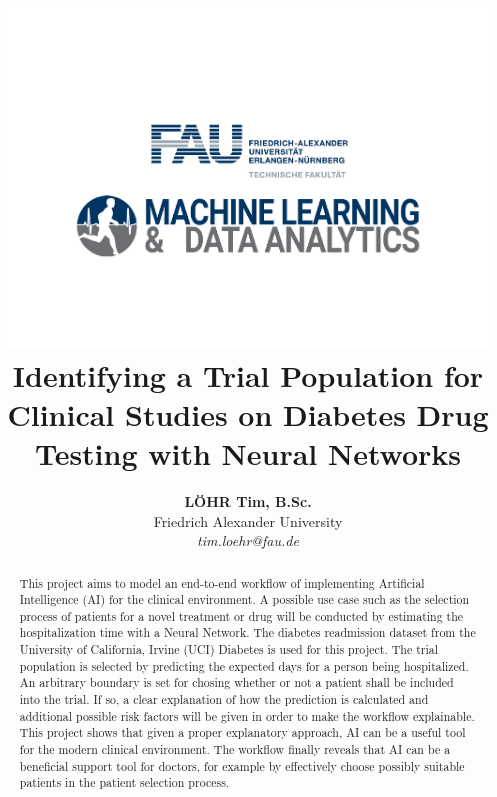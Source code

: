 \documentclass[journal]{IEEEtran}
\begin{document}
    \title{
    	\includegraphics[width=5in]{../imgs/logo_paper3.pdf} 
    	\newline
     Identifying a Trial Population for Clinical Studies on Diabetes Drug Testing with Neural Networks \\ 
     }

  \author{\textbf{L\"OHR Tim, B.Sc.} \\ Friedrich Alexander University \\ \textit{tim.loehr@fau.de}}




\maketitle
\begin{abstract}
This project aims to model an end-to-end workflow of implementing Artificial Intelligence (AI) for the clinical environment. A possible use case such as the selection process of patients for a novel treatment or drug will be conducted by estimating the hospitalization time with a Neural Network.
The diabetes readmission dataset from the University of California, Irvine (UCI) Diabetes is used for this project. The trial population is selected by predicting the expected days for a person being hospitalized. An arbitrary boundary is set for chosing whether or not a patient shall be included into the trial. If so, a clear explanation of how the prediction is calculated and additional possible risk factors will be given in order to make the workflow explainable. This project shows that given a proper explanatory approach, AI can be a useful tool for the modern clinical environment. The workflow finally reveals that AI can be a beneficial support tool for doctors, for example by effectively choose possibly suitable patients in the patient selection process. 
\end{abstract}
\end{document}
